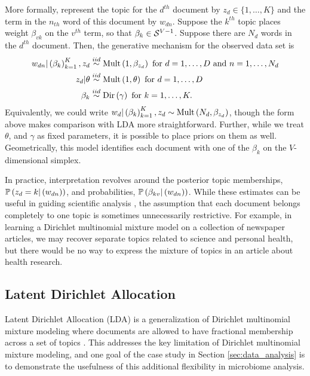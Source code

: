 \documentclass{article}
\begin{document}
More formally, represent the topic for the $d^{th}$ document by $z_{d} \in \{1,
\dots, K\}$ and the term in the $n_{th}$ word of this document by $w_{dn}$.
Suppose the $k^{th}$ topic places weight $\beta_{vk}$ on the $v^{th}$ term, so
that $\beta_{k} \in \mathcal{S}^{V - 1}$. Suppose there are $N_{d}$ words in the
$d^{th}$ document. Then, the generative mechanism for the observed data set is
\begin{align*}
  w_{dn} \vert \left(\beta_{k}\right)_{k = 1}^{K}, z_{d} &\overset{iid}{\sim}\textnormal{Mult}\left(1, \beta_{z_{d}}\right) \text{ for } d = 1, \dots, D \text{ and } n = 1, \dots, N_{d} \\
  z_{d} \vert \theta &\overset{iid}{\sim} \textnormal{Mult}\left(1, \theta\right) \text{ for } d = 1, \dots, D \\
  \beta_{k} &\overset{iid}{\sim} \textnormal{Dir}\left(\gamma\right) \text{ for } k = 1, \dots, K.
\end{align*}
Equivalently, we could write $w_{d} \vert \left(\beta_{k}\right)_{k = 1}^{K},
z_{d} \sim \textnormal{Mult}\left(N_{d}, \beta_{z_{d}}\right)$, though the form above makes
comparison with LDA more straightforward. Further, while we treat $\theta$, and
$\gamma$ as fixed parameters, it is possible to place priors on them as well.
Geometrically, this model identifies each document with one of the $\beta_{k}$ on
the $V$-dimensional simplex.

In practice, interpretation revolves around the posterior topic memberships,
$\mathbb{P}\left({z_{d} = k \vert \left(w_{dn}\right)}\right)$, and probabilities,
$\mathbb{P}\left({\beta_{kv}\vert \left(w_{dn}\right)}\right)$. While these
estimates can be useful in guiding scientific analysis \citep{nigam2000text,
  holmes2012dirichlet}, the assumption that each document belongs completely to
one topic is sometimes unnecessarily restrictive. For example, in learning a
Dirichlet multinomial mixture model on a collection of newspaper articles, we
may recover separate topics related to science and personal health, but there
would be no way to express the mixture of topics in an article about health
research.

\subsection{Latent Dirichlet Allocation}

Latent Dirichlet Allocation (LDA) is a generalization of Dirichlet multinomial
mixture modeling where documents are allowed to have fractional membership
across a set of topics \citep{blei2003latent}. This addresses the key limitation
of Dirichlet multinomial mixture modeling, and one goal of the case study in
Section \ref{sec:data_analysis} is to demonstrate the usefulness of this
additional flexibility in microbiome analysis.
\end{document}
